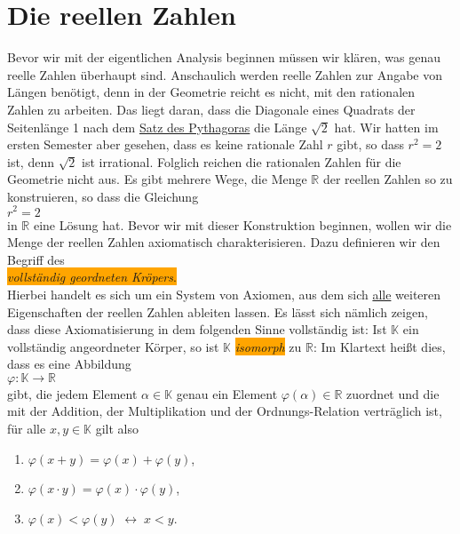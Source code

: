 \chapter{Die reellen Zahlen}
Bevor wir mit der eigentlichen Analysis beginnen m\"ussen wir kl\"aren, was genau reelle Zahlen
\"uberhaupt sind.  Anschaulich werden reelle Zahlen zur Angabe von L\"angen ben\"otigt, denn in der Geometrie
reicht es nicht, mit den rationalen Zahlen zu arbeiten.  Das liegt daran, dass die Diagonale eines
Quadrats der Seitenl\"ange 1 nach dem 
\href{http://de.wikipedia.org/wiki/Satz_des_Pythagoras}{Satz des Pythagoras} die L\"ange $\sqrt{2}$ hat.
Wir hatten im ersten Semester aber gesehen, dass es keine rationale Zahl $r$ gibt,
so dass $r^2 = 2$ ist, denn $\sqrt{2}$ ist irrational.  Folglich reichen die rationalen Zahlen f\"ur die Geometrie
nicht aus.  Es gibt mehrere Wege, die Menge $\mathbb{R}$ der reellen Zahlen so zu konstruieren, so dass die Gleichung 
\\[0.2cm]
\hspace*{1.3cm}
$r^2 = 2$
\\[0.2cm]
in $\mathbb{R}$ eine L\"osung hat.  Bevor wir mit dieser Konstruktion beginnen, wollen wir die Menge
der reellen Zahlen axiomatisch charakterisieren.  Dazu definieren wir den Begriff des
\\[0.2cm]
\hspace*{1.3cm}
\colorbox{orange}{\emph{vollst\"andig geordneten Kr\"opers}.}
\\[0.2cm]
Hierbei handelt es sich um ein System von Axiomen, aus dem
sich \underline{alle} weiteren Eigenschaften der reellen Zahlen ableiten lassen.  Es l\"asst sich n\"amlich zeigen,
dass diese Axiomatisierung in dem folgenden Sinne vollst\"andig ist:
Ist $\mathbb{K}$ ein vollst\"andig angeordneter K\"orper, so ist $\mathbb{K}$ \colorbox{orange}{\emph{isomorph}} zu
$\mathbb{R}$: Im Klartext hei\ss{}t dies, dass es eine Abbildung
\\[0.2cm]
\hspace*{1.3cm}
$\varphi:\mathbb{K} \rightarrow \mathbb{R}$
\\[0.2cm]
gibt, die jedem Element $\alpha \in \mathbb{K}$ genau ein Element $\varphi(\alpha) \in \mathbb{R}$
zuordnet und die mit der Addition, der Multiplikation und der Ordnungs-Relation vertr\"aglich ist, f\"ur alle $x,y \in
\mathbb{K}$ gilt also 
\begin{enumerate}
\item $\varphi(x + y) = \varphi(x) + \varphi(y)$,
\item $\varphi(x \cdot y) = \varphi(x) \cdot \varphi(y)$,
\item $\varphi(x) < \varphi(y) \;\leftrightarrow\; x < y$.
\end{enumerate}

